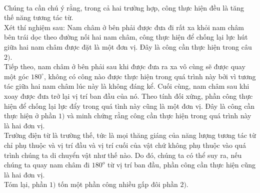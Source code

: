 \begin{loigiai} \\
Chúng ta cần chú ý rằng, trong cả hai trường hợp, công thực hiện đều là tăng thế năng tương tác từ.\\
Xét thí nghiệm sau: Nam châm ở bên phải được đưa đi rất xa khỏi nam châm bên trái dọc theo đường nối hai nam châm, công thực hiện để chống lại lực hút giữa hai nam châm được đặt là một đơn vị. Đây là công cần thực hiện trong câu $2)$.\\
Tiếp theo, nam châm ở bên phải sau khi được đưa ra xa vô cùng sẽ được quay một góc $180^\circ$, không có công nào được thực hiện trong quá trình này bởi vì tương tác giữa hai nam châm lúc này là không đáng kể. Cuối cùng, nam châm sau khi xoay được đưa trở lại vị trí ban đầu của nó. Theo tính đối xứng, phần công thực hiện để chống lại lực đẩy trong quá tình này cũng là một đơn vị. Đây là công cần thực hiện ở phần $1)$ và minh chứng rằng công cần thực hiện trong quá trình này là hai đơn vị.\\
Trường điện từ là trường thế, tức là mọi thăng giáng của năng lượng tương tác từ chỉ phụ thuộc và vị trí đầu và vị trí cuối của vật chứ không phụ thuộc vào quá trình chúng ta di chuyển vật như thế nào. Do đó, chúng ta có thể suy ra, nếu chúng ta quay nam châm đi $180^o$ từ vị trí ban đầu, phần công cần thực hiện cũng là hai đơn vị. \\
Tóm lại, phần $1)$ tốn một phần công nhiều gấp đôi phần $2)$.
\end{loigiai}

